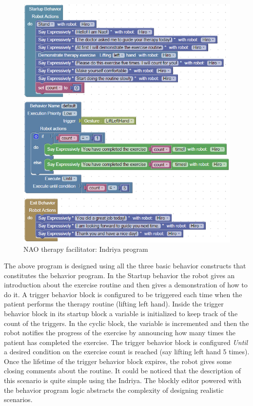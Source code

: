 \begin{figure}
\centering
\includegraphics[width=\textwidth]{../thesis/assets/scenario2_new.png}
\caption[NAO therapy facilitator: Indriya program]{NAO therapy facilitator: Indriya program}
\label{fig:scenario2_program}
\end{figure}
The above program is designed using all the three basic behavior constructs that constitutes the behavior program. In the Startup behavior the robot gives an introduction about the exercise routine and then gives a demonstration of how to do it. A trigger behavior block is configured to be triggered each time when the patient performs the therapy routine (lifting left hand). Inside the trigger behavior block in its startup block a variable is initialized to keep track of the count of the triggers. In the cyclic block, the variable is incremented and then the robot notifies the progress of the exercise by announcing how many times the patient has completed the exercise. The trigger behavior block is configured \emph{Until} a desired condition on the exercise count is reached (say lifting left hand 5 times). Once the lifetime of the trigger behavior block expires, the robot gives some closing comments about the routine. It could be noticed that the description of this scenario is quite simple using the Indriya. The blockly editor powered with the behavior program logic abstracts the complexity of designing realistic scenarios.
